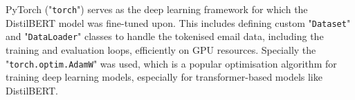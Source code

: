\noindent PyTorch ("\texttt{torch}") serves as the deep learning framework for which the DistilBERT model was fine-tuned upon. This includes defining custom "\texttt{Dataset}" and "\texttt{DataLoader}" classes to handle the tokenised email data, including the training and evaluation loops, efficiently on GPU resources. Specially the "\texttt{torch.optim.AdamW}" was used, which is a popular optimisation algorithm for training deep learning models, especially for transformer-based models like DistilBERT.
